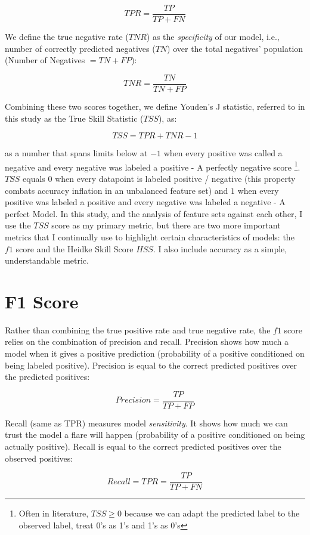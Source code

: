 \documentclass[defaultstyle,11pt]{thesis}
\begin{document}
$$TPR = \frac{TP}{TP + FN}$$

We define the true negative rate ($TNR$) as the \textit{specificity} of our model, i.e., number of correctly predicted negatives ($TN$) over the total negatives' population (Number of Negatives $= TN + FP$):

$$TNR = \frac{TN}{TN + FP}$$

Combining these two scores together, we define Youden's J statistic, referred to in this study as the True Skill Statistic ($TSS$), as:

$$TSS = TPR + TNR - 1$$

as a number that spans limits below at $-1$ when every positive was called a negative and every negative was labeled a positive - A perfectly negative score \footnote{Often in literature, $TSS \geq 0$ because we can adapt the predicted label to the observed label, treat 0's as 1's and 1's as 0's}. $TSS$ equals $0$ when every datapoint is labeled positive / negative (this property combats accuracy inflation in an unbalanced feature set) and $1$ when every positive was labeled a positive and every negative was labeled a negative - A perfect Model. In this study, and the analysis of feature sets against each other, I use the $TSS$ score as my primary metric, but there are two more important metrics that I continually use to highlight certain characteristics of models: the $f1$ score and the Heidke Skill Score $HSS$. I also include accuracy as a simple, understandable metric.


\section{F1 Score}
Rather than combining the true positive rate and true negative rate, the $f1$ score relies on the combination of precision and recall. Precision shows how much  a model when it gives a positive prediction (probability of a positive conditioned on being labeled positive). Precision is equal to the correct predicted positives over the predicted positives:

$$Precision = \frac{TP}{TP + FP}$$

Recall (same as TPR) measures model \textit{sensitivity}. It shows how much we can trust the model  a flare will happen (probability of a positive conditioned on being actually positive). Recall is equal to the correct predicted positives over the observed positives:

$$Recall = TPR = \frac{TP}{TP + FN}$$
\end{document}
